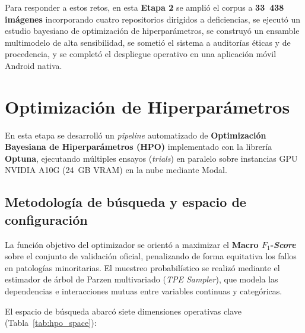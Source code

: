 \documentclass[12pt,letterpaper]{article}
\begin{document}
Para responder a estos retos, en esta \textbf{Etapa 2} se ampli\'o el corpus a \textbf{33~438 im\'agenes} incorporando cuatro repositorios dirigidos a deficiencias, se ejecut\'o un estudio bayesiano de optimizaci\'on de hiperpar\'ametros, se construy\'o un ensamble multimodelo de alta sensibilidad, se someti\'o el sistema a auditor\'ias \'eticas y de procedencia, y se complet\'o el despliegue operativo en una aplicaci\'on m\'ovil Android nativa.

\newpage

\section{Optimizaci\'on de Hiperpar\'ametros}

En esta etapa se desarroll\'o un \textit{pipeline} automatizado de \textbf{Optimizaci\'on Bayesiana de Hiperpar\'ametros (HPO)} implementado con la librer\'ia \textbf{Optuna}, ejecutando m\'ultiples ensayos (\textit{trials}) en paralelo sobre instancias GPU NVIDIA A10G (24~GB VRAM) en la nube mediante Modal.

\subsection{Metodolog\'ia de b\'usqueda y espacio de configuraci\'on}

La funci\'on objetivo del optimizador se orient\'o a maximizar el \textbf{Macro $F_1$-\textit{Score}} sobre el conjunto de validaci\'on oficial, penalizando de forma equitativa los fallos en patolog\'ias minoritarias. El muestreo probabil\'istico se realiz\'o mediante el estimador de \'arbol de Parzen multivariado (\textit{TPE Sampler}), que modela las dependencias e interacciones mutuas entre variables continuas y categ\'oricas.

El espacio de b\'usqueda abarc\'o siete dimensiones operativas clave (Tabla~\ref{tab:hpo_space}):
\end{document}
